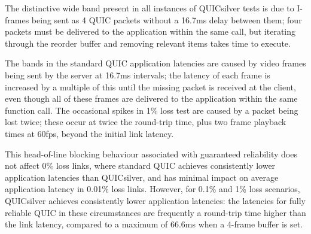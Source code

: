 \documentclass{mpaper}
\begin{document}
The distinctive wide band present in all instances of QUICsilver tests is due to I-frames being sent as 4 QUIC packets without a 16.7ms delay between them; four packets must be delivered to the application within the same call, but iterating through the reorder buffer and removing relevant items takes time to execute.


The bands in the standard QUIC application latencies are caused by video frames being sent by the server at 16.7ms intervals; the latency of each frame is increased by a multiple of this until the missing packet is received at the client, even though all of these frames are delivered to the application within the same function call. The occasional spikes in 1\% loss test are caused by a packet being lost twice; these occur at twice the round-trip time, plus two frame playback times at 60fps, beyond the initial link latency.


This head-of-line blocking behaviour associated with guaranteed reliability does not affect 0\% loss links, where standard QUIC achieves consistently lower application latencies than QUICsilver, and has minimal impact on average application latency in 0.01\% loss links. However, for 0.1\% and 1\% loss scenarios, QUICsilver achieves consistently lower application latencies: the latencies for fully reliable QUIC in these circumstances are frequently a round-trip time higher than the link latency, compared to a maximum of 66.6ms when a 4-frame buffer is set.

\clearpage
\end{document}
